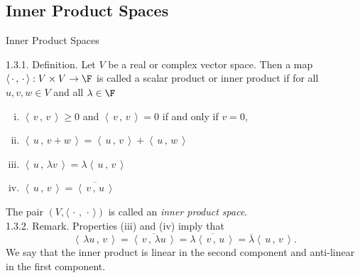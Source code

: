 \documentclass[smaller,hyperref={CJKbookmarks=true}]{beamer}
\newcommand{\scp}[2]{\left\langle\,#1\,,\,#2\,\right\rangle} \newcommand{\scpp}{\langle\,\cdot\,,\,\cdot\,\rangle}
\begin{document}
\subsection{Inner Product Spaces}
\begin{frame}[c]
\begin{spacing}{2.5}
\tableofcontents[sectionstyle=hide,subsectionstyle=show/shaded/hide] \end{spacing}
\end{frame}
\begin{frame}[t,shrink]{Inner Product Spaces}
\begin{spacing}{1.1}
\alert{1.3.1. Definition.} Let $V$ be a real or complex vector space. Then a map $\langle\,\cdot\,,\,\cdot\,\rangle: V\times V\rightarrow\F$ is called a scalar product or inner product if for all $u,v,w\in V$ and all $\lambda\in\F$
\begin{enumerate}[(i)]
  \item $\scp{v}{v}\geq0$ and $\scp{v}{v}=0$ if and only if $v=0$,
  \item $\scp{u}{v+w}=\scp{u}{v}+\scp{u}{w}$
  \item $\scp{u}{\lambda v}=\lambda\scp{u}{v}$
  \item $\scp{u}{v}=\overline{\scp{v}{u}}$
\end{enumerate}
The pair $(V,\scpp)$ is called an \emph{inner product space}.\\[12pt]
\alert{1.3.2. Remark.} Properties (iii) and (iv) imply that
\[\scp{\lambda u}{v}=\overline{\scp{v}{\lambda u}}=\overline{\lambda\scp{v}{u}}=\overline{\lambda}\scp{u}{v}.\]
We say that the inner product is linear in the second component and
anti-linear in the first component.
\end{spacing}
\end{frame}
\end{document}

